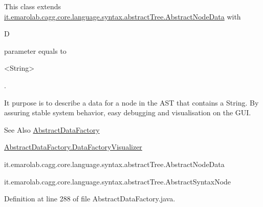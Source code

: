 This class extends \hyperlink{}{it.\-emarolab.\-cagg.\-core.\-language.\-syntax.\-abstract\-Tree.\-Abstract\-Node\-Data} with
\begin{DoxyCode}
D 
\end{DoxyCode}
 parameter equals to
\begin{DoxyCode}
<String> 
\end{DoxyCode}
 .\par
 It purpose is to describe a data for a node in the A\-S\-T that contains a String. By assuring stable system behavior, easy debugging and visualisation on the G\-U\-I. 

\begin{DoxySeeAlso}{See Also}
\hyperlink{classit_1_1emarolab_1_1cagg_1_1core_1_1language_1_1syntax_1_1abstractTree_1_1AbstractDataFactory}{Abstract\-Data\-Factory} 

\hyperlink{classit_1_1emarolab_1_1cagg_1_1core_1_1language_1_1syntax_1_1abstractTree_1_1AbstractDataFactory_1_1DataFactoryVisualizer}{Abstract\-Data\-Factory.\-Data\-Factory\-Visualizer} 

it.\-emarolab.\-cagg.\-core.\-language.\-syntax.\-abstract\-Tree.\-Abstract\-Node\-Data 

it.\-emarolab.\-cagg.\-core.\-language.\-syntax.\-abstract\-Tree.\-Abstract\-Syntax\-Node 
\end{DoxySeeAlso}


Definition at line 288 of file Abstract\-Data\-Factory.\-java.



